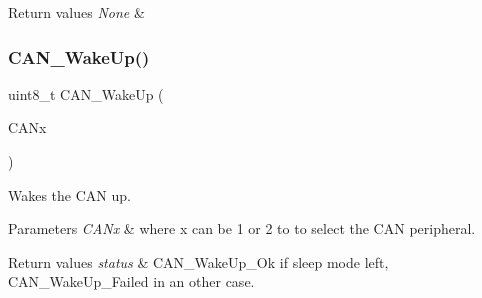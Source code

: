\begin{DoxyRetVals}{Return values}
{\em None} & \\
\hline
\end{DoxyRetVals}
\mbox{\label{group___c_a_n___private___functions_ga78cdfbf1884b9e33c552bcbca15bed10}} 
\subsubsection{\texorpdfstring{CAN\_WakeUp()}{CAN\_WakeUp()}}
{\footnotesize\ttfamily uint8\+\_\+t C\+A\+N\+\_\+\+Wake\+Up (\begin{DoxyParamCaption}\item[{\mbox{\hyperlink{struct_c_a_n___type_def}{C\+A\+N\+\_\+\+Type\+Def}} $\ast$}]{C\+A\+Nx }\end{DoxyParamCaption})}



Wakes the C\+AN up. 


\begin{DoxyParams}{Parameters}
{\em C\+A\+Nx} & where x can be 1 or 2 to to select the C\+AN peripheral. \\
\hline
\end{DoxyParams}

\begin{DoxyRetVals}{Return values}
{\em status} & C\+A\+N\+\_\+\+Wake\+Up\+\_\+\+Ok if sleep mode left, C\+A\+N\+\_\+\+Wake\+Up\+\_\+\+Failed in an other case. \\
\hline
\end{DoxyRetVals}
